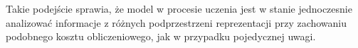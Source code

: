 Takie podejście sprawia, że model w procesie uczenia jest w stanie jednoczesnie analizować informacje z różnych podprzestrzeni reprezentacji przy zachowaniu podobnego kosztu obliczeniowego, jak w przypadku pojedycznej uwagi.
